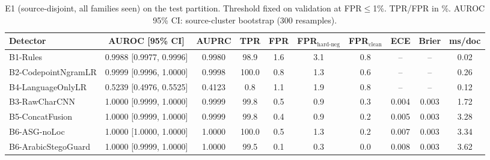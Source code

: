 \begin{table}[!t]
\caption{E1 (source-disjoint, all families seen) on the test partition. Threshold fixed on validation at FPR$\le$1\%. TPR/FPR in \%. AUROC 95\% CI: source-cluster bootstrap (300 resamples).}
\label{tab:e1}
\centering\footnotesize
\begin{tabular}{@{}lccccccccc@{}}
\toprule
Detector & AUROC [95\% CI] & AUPRC & TPR & FPR & FPR$_{\text{hard-neg}}$ & FPR$_{\text{clean}}$ & ECE & Brier & ms/doc \\
\midrule
B1-Rules & 0.9988 [0.9977, 0.9996] & 0.9980 & 98.9 & 1.6 & 3.1 & 0.8 & -- & -- & 0.02 \\
B2-CodepointNgramLR & 0.9999 [0.9996, 1.0000] & 0.9998 & 100.0 & 0.8 & 1.3 & 0.6 & -- & -- & 0.26 \\
B4-LanguageOnlyLR & 0.5239 [0.4976, 0.5525] & 0.4123 & 0.8 & 1.1 & 1.9 & 0.8 & -- & -- & 0.12 \\
B3-RawCharCNN & 1.0000 [0.9999, 1.0000] & 0.9999 & 99.8 & 0.5 & 0.9 & 0.3 & 0.004 & 0.003 & 1.72 \\
B5-ConcatFusion & 1.0000 [0.9999, 1.0000] & 0.9999 & 99.8 & 0.4 & 0.9 & 0.2 & 0.005 & 0.003 & 3.28 \\
B6-ASG-noLoc & 1.0000 [1.0000, 1.0000] & 1.0000 & 100.0 & 0.5 & 1.3 & 0.2 & 0.007 & 0.003 & 3.34 \\
B6-ArabicStegoGuard & 1.0000 [0.9999, 1.0000] & 1.0000 & 99.5 & 0.1 & 0.3 & 0.0 & 0.008 & 0.003 & 3.62 \\
\bottomrule
\end{tabular}
\end{table}

\begin{table}[!t]
\caption{E2 leave-one-embedding-family-out: AUROC / TPR (\%) on the unseen family at the validation threshold (FPR$\le$1\%).}
\label{tab:e2}
\centering\footnotesize
\setlength{\tabcolsep}{3pt}
\end{table}

